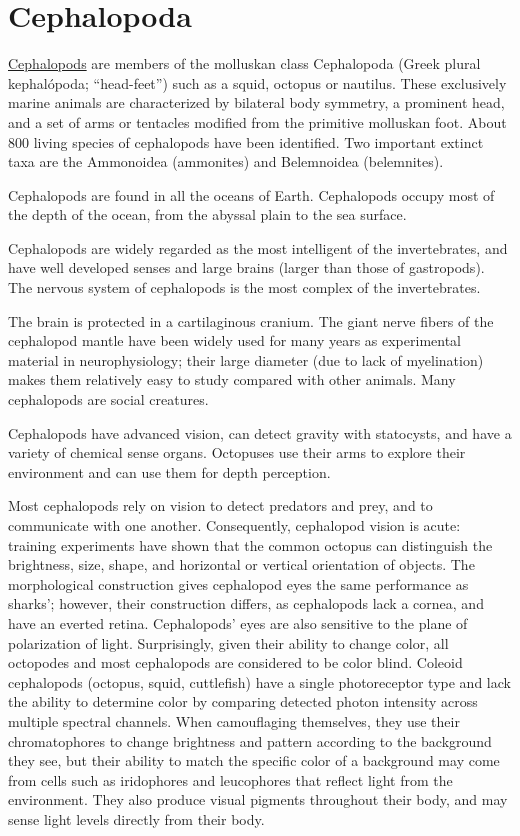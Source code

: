 \section{Cephalopoda}\label{cephalopoda}

\href{https://en.wikipedia.org/wiki/Cephalopod}{Cephalopods} are members
of the molluskan class Cephalopoda (Greek plural kephalópoda;
``head-feet'') such as a squid, octopus or nautilus. These exclusively
marine animals are characterized by bilateral body symmetry, a prominent
head, and a set of arms or tentacles modified from the primitive
molluskan foot. About 800 living species of cephalopods have been
identified. Two important extinct taxa are the Ammonoidea (ammonites)
and Belemnoidea (belemnites).

Cephalopods are found in all the oceans of Earth. Cephalopods occupy
most of the depth of the ocean, from the abyssal plain to the sea
surface.

Cephalopods are widely regarded as the most intelligent of the
invertebrates, and have well developed senses and large brains (larger
than those of gastropods). The nervous system of cephalopods is the most
complex of the invertebrates.

The brain is protected in a cartilaginous cranium. The giant nerve
fibers of the cephalopod mantle have been widely used for many years as
experimental material in neurophysiology; their large diameter (due to
lack of myelination) makes them relatively easy to study compared with
other animals. Many cephalopods are social creatures.

Cephalopods have advanced vision, can detect gravity with statocysts,
and have a variety of chemical sense organs. Octopuses use their arms to
explore their environment and can use them for depth perception.

Most cephalopods rely on vision to detect predators and prey, and to
communicate with one another. Consequently, cephalopod vision is acute:
training experiments have shown that the common octopus can distinguish
the brightness, size, shape, and horizontal or vertical orientation of
objects. The morphological construction gives cephalopod eyes the same
performance as sharks'; however, their construction differs, as
cephalopods lack a cornea, and have an everted retina. Cephalopods' eyes
are also sensitive to the plane of polarization of light. Surprisingly,
given their ability to change color, all octopodes and most cephalopods
are considered to be color blind. Coleoid cephalopods (octopus, squid,
cuttlefish) have a single photoreceptor type and lack the ability to
determine color by comparing detected photon intensity across multiple
spectral channels. When camouflaging themselves, they use their
chromatophores to change brightness and pattern according to the
background they see, but their ability to match the specific color of a
background may come from cells such as iridophores and leucophores that
reflect light from the environment. They also produce visual pigments
throughout their body, and may sense light levels directly from their
body.


